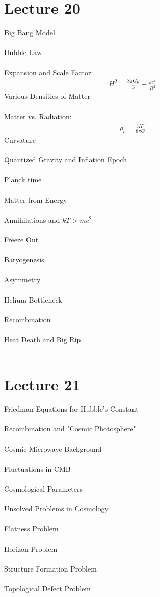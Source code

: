 \documentclass[11pt,reqno]{article}
\theoremstyle{definition}
\begin{document}
\section*{Lecture 20}
Big Bang Model\\\\
Hubble Law\\\\
Expansion and Scale Factor:
\begin{align*}
    H^2 = \frac{8\pi G\rho}{3} - \frac{kc^2}{R^2}
\end{align*}
Various Densities of Matter\\\\
Matter vs. Radiation:
\begin{align*}
    \rho_c = \frac{3H^2}{8\pi G}
\end{align*}
Curvature\\\\
Quantized Gravity and Inflation Epoch\\\\
Planck time\\\\
Matter from Energy\\\\
Annihilations and $kT > mc^2$\\\\
Freeze Out\\\\
Baryogenesis\\\\
Asymmetry\\\\
Helium Bottleneck\\\\
Recombination\\\\
Heat Death and Big Rip\\\\

\section*{Lecture 21}
Friedman Equations for Hubble's Constant\\\\
Recombination and "Cosmic Photosphere"\\\\
Cosmic Microwave Background\\\\
Fluctuations in CMB\\\\
Cosmological Parameters\\\\
Unsolved Problems in Cosmology\\\\
Flatness Problem\\\\
Horizon Problem\\\\
Structure Formation Problem\\\\
Topological Defect Problem\\\\
\end{document}
